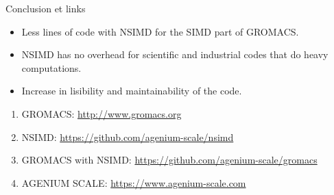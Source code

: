 \documentclass[shrink, compress, mathserif, 10pt, xcolor=dvipsnames,
               aspectratio=169]{beamer}
\begin{document}
\begin{frame}{Conclusion et links}
  \begin{itemize}
    \item
      Less lines of code with NSIMD for the SIMD part of GROMACS.
    \item
      NSIMD has no overhead for scientific and industrial codes that do
      heavy computations.
    \item
      Increase in lisibility and maintainability of the code.
  \end{itemize}

  \vspace{2em}
  \begin{enumerate}
    \item GROMACS: \url{http://www.gromacs.org}
    \item NSIMD: \url{https://github.com/agenium-scale/nsimd}
    \item GROMACS with NSIMD: \url{https://github.com/agenium-scale/gromacs}
    \item AGENIUM SCALE: \url{https://www.agenium-scale.com}
  \end{enumerate}
\end{frame}
\end{document}
